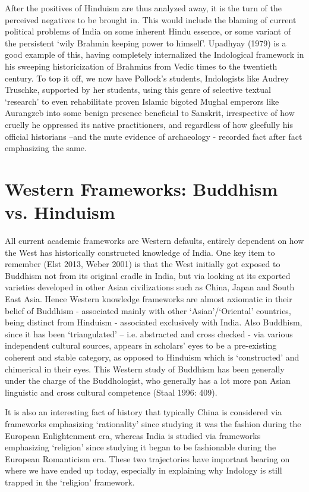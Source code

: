 \newpage

After the positives of Hinduism are thus analyzed away, it is the turn of the perceived negatives to be brought in. This would include the blaming of current political problems of India on some inherent Hindu essence, or some variant of the persistent ‘wily Brahmin keeping power to himself’. Upadhyay (1979) is a good example of this, having completely internalized the Indological framework in his sweeping historicization of Brahmins from Vedic times to the twentieth century. To top it off, we now have Pollock’s students, Indologists like Audrey Truschke, supported by her students, using this genre of selective textual ‘research’ to even rehabilitate proven Islamic bigoted Mughal emperors like Aurangzeb into some benign presence beneficial to Sanskrit, irrespective of how cruelly he oppressed its native practitioners, and regardless of how gleefully his official historians –and the mute evidence of archaeology - recorded fact after fact emphasizing the same.


\section*{Western Frameworks: Buddhism vs. Hinduism}

All current academic frameworks are Western defaults, entirely dependent on how the West has historically constructed knowledge of India. One key item to remember (Elst 2013, Weber 2001) is that the West initially got exposed to Buddhism not from its original cradle in India, but via looking at its exported varieties developed in other Asian civilizations such as China, Japan and South East Asia. Hence Western knowledge frameworks are almost axiomatic in their belief of Buddhism - associated mainly with other ‘Asian’/‘Oriental’ countries, being distinct from Hinduism - associated exclusively with India. Also Buddhism, since it has been ‘triangulated’ – i.e. abstracted and cross checked - via various independent cultural sources, appears in scholars’ eyes to be a pre-existing coherent and stable category, as opposed to Hinduism which is ‘constructed’ and chimerical in their eyes. This Western study of Buddhism has been generally under the charge of the Buddhologist, who generally has a lot more pan Asian linguistic and cross cultural competence (Staal 1996: 409).

It is also an interesting fact of history that typically China is considered via frameworks emphasizing ‘rationality’ since studying it was the fashion during the European Enlightenment era, whereas India is studied via frameworks emphasizing ‘religion’ since studying it began to be fashionable during the European Romanticism era. These two trajectories have important bearing on where we have ended up today, especially in explaining why Indology is still trapped in the ‘religion’ framework.

